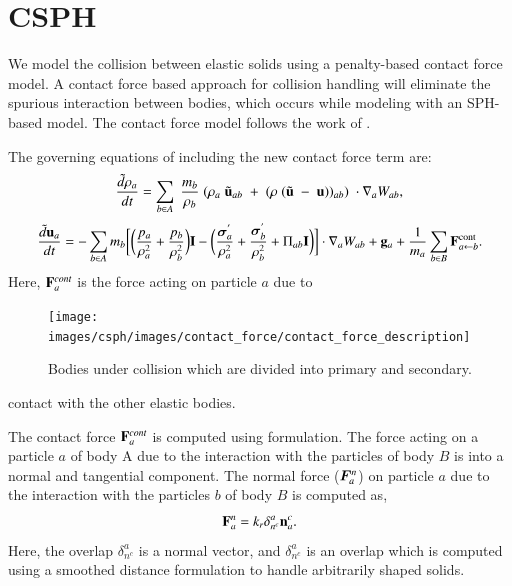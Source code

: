 \FloatBarrier%
\chapter{CSPH}
\label{chap:csph}

We model the collision between elastic solids using a penalty-based contact
force model. A contact force based approach for collision handling will
eliminate the spurious interaction between bodies, which occurs while modeling
with an SPH-based model. The contact force model follows the work of
\textcite{mohseni2021particle}.

The governing equations of including the new contact force term are:
\begin{equation}
\label{eqn:sph-continuity}
  \frac{\tilde{d}\rho_a}{dt} = \sum_{b \in A} \; \frac{m_b}{\rho_{b}} \; (
  \rho_{a} \; \tilde{\mathbf{u}}_{ab} \; + \;
  (\rho \; (\tilde{\mathbf{u}} \; - \;
  \mathbf{u}))_{ab}) \; \cdot \nabla_{a} W_{ab},
\end{equation}
\begin{equation}
\label{eqn:sph-momentum}
  \frac{\tilde{d}\mathbf{u}_{a}}{dt} = - \sum_{b \in A} m_b \bigg[
  \bigg(\frac{p_a}{\rho_a^2} + \frac{p_b}{\rho_b^2}\bigg) \mathbf{I} -
  \bigg(\frac{\boldsymbol{\sigma}^{'}_{a}}{\rho_a^2} +
  \frac{\boldsymbol{\sigma}^{'}_{b}}{\rho_b^2} + \Pi_{ab} \mathbf{I} \bigg) \bigg]  \cdot \nabla_{a} W_{ab} +
  \mathbf{g}_{a} + \frac{1}{m_a}\sum_{b \in B} \mathbf{F}^{\text{cont}}_{a \leftarrow b}.
\end{equation}
Here, $\mathbf{F}^{cont}_{a}$ is the force acting on particle $a$ due to
\begin{figure}[!htpb]
  \centering
  \texttt{[image: images/csph/images/contact\_force/contact\_force\_description]}
  \caption{Bodies under collision which are divided into primary and
    secondary.}
\label{fig:bodies_under_collision}
\end{figure}
contact with the other elastic bodies.

The contact force $\mathbf{F}^{cont}_{a}$ is computed using
\textcite{mohseni2021particle} formulation. The force acting on a particle $a$ of
body A due to the interaction with the particles of body $B$ is into a normal
and tangential component. The normal force ($\boldsymbol{F}_a^{n}$) on particle $a$
due to the interaction with the particles $b$ of body $B$ is computed as,
\begin{equation}
  \label{eq:contact-algorithm-normal}
  \mathbf{F}_a^n = k_r \delta_{n^{c}}^{a} \mathbf{n}_a^{c}.
\end{equation}
Here, the overlap $\delta_{n^{c}}^{a}$ is a normal vector, and
$\delta_{n^{c}}^{a}$ is an overlap which is computed using a smoothed distance
formulation to handle arbitrarily shaped solids.

